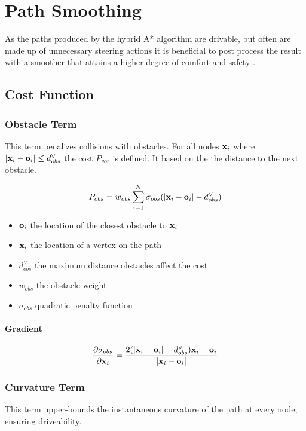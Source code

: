 \section{Path Smoothing}

As the paths produced by the hybrid A* algorithm are drivable, but often are made up of unnecessary steering actions it is beneficial to post process the result with a smoother that attains a higher degree of comfort and safety \cite{Dolgov.2010} .

\subsection{Cost Function}
\subsubsection{Obstacle Term}

This term penalizes collisions with obstacles. For all nodes $\mathbf{x}_i$ where $|\mathbf{x}_i - \mathbf{o}_i| \leq d_{obs}^{\lor}$ the cost $P_{vor}$ is defined. It based on the the distance to the next obstacle.

\begin{equation}
P_{obs} = w_{obs} \displaystyle\sum_{i=1}^{N} \sigma_{obs}(|\mathbf{x}_i-\mathbf{o}_i|-d_{obs}^{\lor})
\end{equation}

\begin{itemize}
\item $\mathbf{o}_i$ the location of the closest obstacle to $\mathbf{x}_i$
\item $\mathbf{x}_i$ the location of a vertex on the path
\item $d_{obs}^{\lor}$  the maximum distance obstacles affect the cost
\item $w_{obs}$ the obstacle weight
\item $\sigma_{obs}$ quadratic penalty function
\end{itemize}

\paragraph{Gradient}

\begin{equation}
\frac{\partial \sigma_{obs}}{\partial \mathbf{x}_i} = \frac{2(|\mathbf{x}_i-\mathbf{o}_i|-d_{obs}^{\lor})\mathbf{x}_i-\mathbf{o}_i}{|\mathbf{x}_i-\mathbf{o}_i|}
\end{equation}

\subsubsection{Curvature Term}
This term upper-bounds the instantaneous curvature of the path at every node, ensuring driveability.

